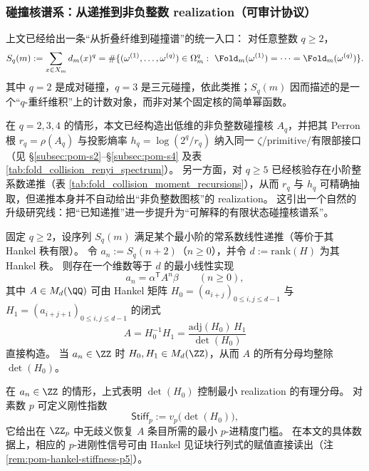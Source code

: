 \subsubsection{碰撞核谱系：从递推到非负整数 realization（可审计协议）}\label{subsubsec:pom-collision-kernel-family}
上文已经给出一条“从折叠纤维到碰撞谱”的统一入口：
对任意整数 \(q\ge 2\)，
\[
S_q(m):=\sum_{x\in X_m}d_m(x)^q
=\#\{(\omega^{(1)},\dots,\omega^{(q)})\in\Omega_m^q:\ \Fold_m(\omega^{(1)})=\cdots=\Fold_m(\omega^{(q)})\}.
\]
其中 \(q=2\) 是成对碰撞，\(q=3\) 是三元碰撞，依此类推；\(S_q(m)\) 因而描述的是一个“\(q\)-重纤维积”上的计数对象，而非对某个固定核的简单幂函数。
\par
在 \(q=2,3,4\) 的情形，本文已经构造出低维的非负整数碰撞核 \(A_q\)，并把其 Perron 根 \(r_q=\rho(A_q)\) 与投影熵率 \(h_q=\log(2^q/r_q)\) 纳入同一 \(\zeta\)/primitive/有限部接口（见 \S\ref{subsec:pom-s2}--\S\ref{subsec:pom-s4} 及表 \ref{tab:fold_collision_renyi_spectrum}）。
另一方面，对 \(q\ge 5\) 已经核验存在小阶整系数递推（表 \ref{tab:fold_collision_moment_recursions}），从而 \(r_q\) 与 \(h_q\) 可精确抽取，但递推本身并不自动给出“非负整数图核”的 realization。
这引出一个自然的升级研究线：把“已知递推”进一步提升为“可解释的有限状态碰撞核谱系”。

\begin{proposition}\label{prop:pom-hankel-realization-protocol}
固定 \(q\ge 2\)，设序列 \(S_q(m)\) 满足某个最小阶的常系数线性递推（等价于其 Hankel 秩有限）。
令 \(a_n:=S_q(n+2)\)（\(n\ge 0\)），并令 \(d:=\mathrm{rank}(H)\) 为其 Hankel 秩。
则存在一个维数等于 \(d\) 的最小线性实现
\[
a_n=\alpha^{\mathsf T}A^n\beta\qquad(n\ge 0),
\]
其中 \(A\in M_d(\QQ)\) 可由 Hankel 矩阵 \(H_0=(a_{i+j})_{0\le i,j\le d-1}\) 与 \(H_1=(a_{i+j+1})_{0\le i,j\le d-1}\) 的闭式
\[
A=H_0^{-1}H_1=\frac{\mathrm{adj}(H_0)\,H_1}{\det(H_0)}
\]
直接构造。
当 \(a_n\in\ZZ\) 时 \(H_0,H_1\in M_d(\ZZ)\)，从而 \(A\) 的所有分母均整除 \(\det(H_0)\)。
\end{proposition}

\begin{remark}\label{rem:pom-hankel-denominator-stiffness}
在 \(a_n\in\ZZ\) 的情形，上式表明 \(\det(H_0)\) 控制最小 realization 的有理分母。
对素数 \(p\) 可定义刚性指数
\[
\mathsf{Stiff}_p:=v_p\!\bigl(\det(H_0)\bigr),
\]
它给出在 \(\ZZ_p\) 中无歧义恢复 \(A\) 条目所需的最小 \(p\)-进精度门槛。
在本文的具体数据上，相应的 \(p\)-进刚性信号可由 Hankel 见证块行列式的赋值直接读出（注 \ref{rem:pom-hankel-stiffness-p5}）。
\end{remark}

